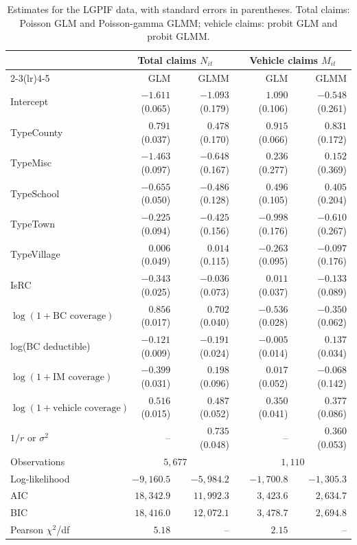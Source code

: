 \begin{table}[htbp]
\centering
\caption{Estimates for the LGPIF data, with standard errors in
parentheses. Total claims: Poisson GLM and Poisson-gamma GLMM; vehicle
claims: probit GLM and probit GLMM.}
\label{tab.lgpif.coef}
\small
\begin{tabular}{lrrrr}
\toprule
& \multicolumn{2}{c}{Total claims \(N_{it}\)} & \multicolumn{2}{c}{Vehicle claims \(M_{it}\)}\\
\cmidrule(lr){2-3}\cmidrule(lr){4-5}
& GLM & GLMM & GLM & GLMM\\
\midrule
Intercept & \(-1.611\) (0.065) & \(-1.093\) (0.179) & \(1.090\) (0.106) & \(-0.548\) (0.261)\\
TypeCounty & \(0.791\) (0.037) & \(0.478\) (0.170) & \(0.915\) (0.066) & \(0.831\) (0.172)\\
TypeMisc & \(-1.463\) (0.097) & \(-0.648\) (0.167) & \(0.236\) (0.277) & \(0.152\) (0.369)\\
TypeSchool & \(-0.655\) (0.050) & \(-0.486\) (0.128) & \(0.496\) (0.105) & \(0.405\) (0.204)\\
TypeTown & \(-0.225\) (0.094) & \(-0.425\) (0.156) & \(-0.998\) (0.176) & \(-0.610\) (0.267)\\
TypeVillage & \(0.006\) (0.049) & \(0.014\) (0.115) & \(-0.263\) (0.095) & \(-0.097\) (0.176)\\
IsRC & \(-0.343\) (0.025) & \(-0.036\) (0.073) & \(0.011\) (0.037) & \(-0.133\) (0.089)\\
\(\log(1+\text{BC coverage})\) & \(0.856\) (0.017) & \(0.702\) (0.040) & \(-0.536\) (0.028) & \(-0.350\) (0.062)\\
log(BC deductible) & \(-0.121\) (0.009) & \(-0.191\) (0.024) & \(-0.005\) (0.014) & \(0.137\) (0.034)\\
\(\log(1+\text{IM coverage})\) & \(-0.399\) (0.031) & \(0.198\) (0.096) & \(0.017\) (0.052) & \(-0.068\) (0.142)\\
\(\log(1+\text{vehicle coverage})\) & \(0.516\) (0.015) & \(0.487\) (0.052) & \(0.350\) (0.041) & \(0.377\) (0.086)\\
\(1/r\) or \(\sigma^2\) & -- & \(0.735\) (0.048) & -- & \(0.360\) (0.053)\\
\midrule
Observations & \multicolumn{2}{c}{\(5{,}677\)} & \multicolumn{2}{c}{\(1{,}110\)}\\
Log-likelihood & \(-9{,}160.5\) & \(-5{,}984.2\) & \(-1{,}700.8\) & \(-1{,}305.3\)\\
AIC & \(18{,}342.9\) & \(11{,}992.3\) & \(3{,}423.6\) & \(2{,}634.7\)\\
BIC & \(18{,}416.0\) & \(12{,}072.1\) & \(3{,}478.7\) & \(2{,}694.8\)\\
Pearson \(\chi^2\)/df & \(5.18\) & -- & \(2.15\) & --\\
\bottomrule
\end{tabular}
\end{table}

